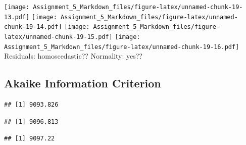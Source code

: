\documentclass[]{article}
\newenvironment{Shaded}{\begin{snugshade}}{\end{snugshade}}
\newcommand{\KeywordTok}[1]{\textcolor[rgb]{0.13,0.29,0.53}{\textbf{#1}}}
\newcommand{\StringTok}[1]{\textcolor[rgb]{0.31,0.60,0.02}{#1}}
\newcommand{\CommentTok}[1]{\textcolor[rgb]{0.56,0.35,0.01}{\textit{#1}}}
\newcommand{\NormalTok}[1]{#1}
\begin{document}
\texttt{[image: Assignment\_5\_Markdown\_files/figure-latex/unnamed-chunk-19-13.pdf]}
\texttt{[image: Assignment\_5\_Markdown\_files/figure-latex/unnamed-chunk-19-14.pdf]}
\texttt{[image: Assignment\_5\_Markdown\_files/figure-latex/unnamed-chunk-19-15.pdf]}
\texttt{[image: Assignment\_5\_Markdown\_files/figure-latex/unnamed-chunk-19-16.pdf]}
Residuals: homoscedastic?? Normality: yes??

\subsection{Akaike Information
Criterion}\label{akaike-information-criterion}

\begin{Shaded}
\end{Shaded}

\begin{verbatim}
## [1] 9093.826
\end{verbatim}

\begin{Shaded}
\end{Shaded}

\begin{verbatim}
## [1] 9096.813
\end{verbatim}

\begin{Shaded}
\end{Shaded}

\begin{verbatim}
## [1] 9097.22
\end{verbatim}

\begin{Shaded}
\end{Shaded}
\end{document}
